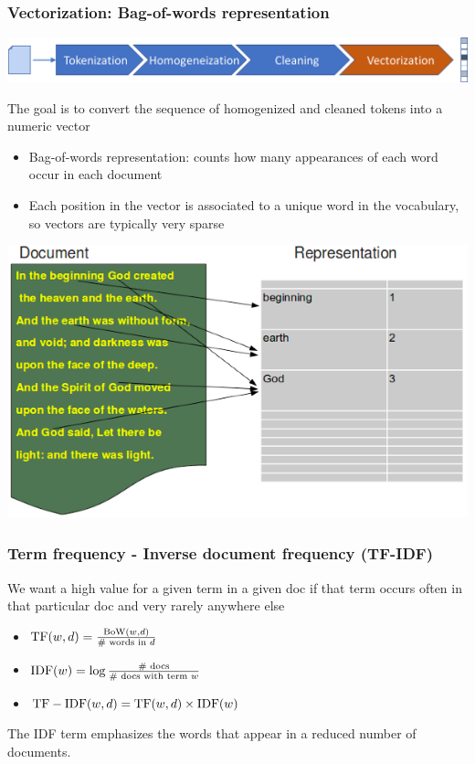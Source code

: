 \documentclass{beamer}
\begin{document}
\begin{frame}

    \frametitle{Vectorization: Bag-of-words representation}

    \centerline{\includegraphics[width=\textwidth]{./figs/NLPTM_vectorization.png}}

    The goal is to convert the sequence of homogenized and cleaned tokens into a numeric vector
    \begin{itemize}
    	\item Bag-of-words representation: counts how many appearances of each word occur in each document
    	\item Each position in the vector is associated to a unique word in the vocabulary, so vectors are typically very sparse
    \end{itemize}
    
    \vspace{.2cm}
    \centerline{\includegraphics[width=.5\textwidth]{./figs/NLPTM_BoW.png}}
    			    
\end{frame}


\begin{frame}

    \frametitle{Term frequency - Inverse document frequency (TF-IDF)}

    We want a high value for a given term in a given doc if that term occurs often in that particular doc and very rarely anywhere else

\vspace{1cm}

	\begin{itemize}
	
	\item ${\rm TF}(w,d) = \frac{{\rm BoW}(w,d)}{\# {\text{ words in } d}}$
	\item ${\rm IDF}(w) = \log \frac{\# {\text{ docs}}}{\# {\text{ docs with term } w}}$
	\item ${\rm TF-IDF}(w,d) = {\rm TF}(w,d) \times {\rm IDF}(w)$
		
	\end{itemize}
	
\vspace{1cm}
	
	The IDF term emphasizes the words that appear in a reduced number of documents.
    			    
\end{frame}
\end{document}
